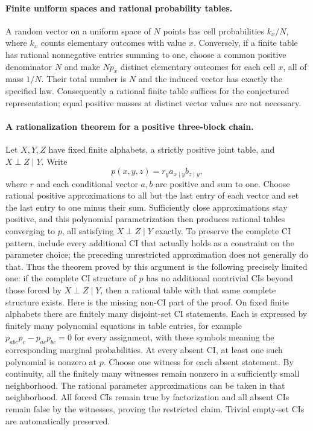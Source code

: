\documentclass[11pt]{article}
\begin{document}
\paragraph{Finite uniform spaces and rational probability tables.}
A random vector on a uniform space of $N$ points has cell probabilities
$k_x/N$, where $k_x$ counts elementary outcomes with value $x$.
Conversely, if a finite table has rational nonnegative entries summing
to one, choose a common positive denominator $N$ and make $Np_x$
distinct elementary outcomes for each cell $x$, all of mass $1/N$.
Their total number is $N$ and the induced vector has exactly the
specified law. Consequently a rational finite table suffices for the
conjectured representation; equal positive masses at distinct vector
values are not necessary.

\paragraph{A rationalization theorem for a positive three-block chain.}
Let $X,Y,Z$ have fixed finite alphabets, a strictly positive joint table,
and $X\perp Z\mid Y$. Write
\[
p(x,y,z)=r_y a_{x\mid y}b_{z\mid y},
\]
where $r$ and each conditional vector $a,b$ are positive and sum to one.
Choose rational positive approximations to all but the last entry of
each vector and set the last entry to one minus their sum. Sufficiently
close approximations stay positive, and this polynomial
parametrization then produces rational tables converging to $p$, all
satisfying $X\perp Z\mid Y$ exactly.
To preserve the complete CI pattern, include every additional CI that
actually holds as a constraint on the parameter choice; the preceding
unrestricted approximation does not generally do that. Thus the theorem
proved by this argument is the following precisely limited one: if the
complete CI structure of $p$ has no additional nontrivial CIs beyond
those forced by $X\perp Z\mid Y$, then a rational table with that same
complete structure exists.
Here is the missing non-CI part of the proof. On fixed finite alphabets
there are finitely many disjoint-set CI statements. Each is expressed
by finitely many polynomial equations in table entries, for example
$p_{abc}p_c-p_{ac}p_{bc}=0$ for every assignment, with these symbols
meaning the corresponding marginal probabilities. At every absent CI,
at least one such polynomial is nonzero at $p$. Choose one witness for
each absent statement. By continuity, all the finitely many witnesses
remain nonzero in a sufficiently small neighborhood. The rational
parameter approximations can be taken in that neighborhood. All forced
CIs remain true by factorization and all absent CIs remain false by
the witnesses, proving the restricted claim. Trivial empty-set CIs
are automatically preserved.
\end{document}
